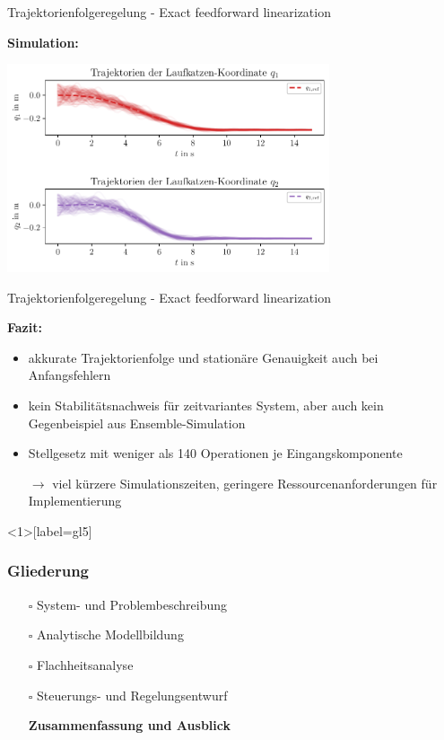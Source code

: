 \documentclass[
	ngerman,
	10pt,				%
	aspectratio=169 	%
]{beamer}
\newcommand{\cdbox}{$\square$\hspace{-0.65em}\raisebox{0.1em}{\checkmark}\hspace{-0.18em}}
\begin{document}

\begin{frame}[t,fragile,label=trajektorienregelung_122]{\large Trajektorienfolgeregelung - Exact feedforward linearization}
	
	\textbf{Simulation:}
	\begin{center}
		\includegraphics[width=95mm]{images/feedforward_lin_selection_initial_error_ensemble_flat_output_q}
	\end{center}
	
\end{frame}


\begin{frame}[t,fragile,label=trajektorienregelung_13]{\large Trajektorienfolgeregelung - Exact feedforward linearization}
	
	\textbf{Fazit:}
	\begin{itemize}
		\item akkurate Trajektorienfolge und stationäre Genauigkeit auch bei Anfangsfehlern
		\bigskip
		\pause
		\item kein Stabilitätsnachweis für zeitvariantes System, aber auch kein Gegenbeispiel aus Ensemble-Simulation
		\pause
		\bigskip
		\item Stellgesetz mit weniger als 140 Operationen je Eingangskomponente
		\item[$\rightarrow$] viel kürzere Simulationszeiten, geringere Ressourcenanforderungen für Implementierung
	\end{itemize}

\end{frame}


\begin{frame}<1>[label=gl5]
	\frametitle{Gliederung}
	\begin{itemize}
		\item[\cdbox] System- und Problembeschreibung
		\item[\cdbox] Analytische Modellbildung
		\item[\cdbox] Flachheitsanalyse
		\item[\cdbox] Steuerungs- und Regelungsentwurf
		\item[\only<1>{$\rightarrow$}\only<2>{$\rightarrow$}\only<4->{\cdbox}]
		\textbf<1>{Zusammenfassung und Ausblick}
	\end{itemize}
\end{frame}
\end{document}
